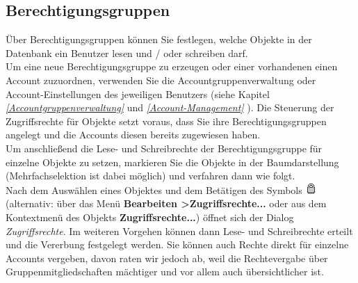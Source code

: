 \documentclass[a4paper,10pt]{book}
\begin{document}
\subsection{Berechtigungsgruppen} \label{Berechtigungsgruppen}
Über Berechtigungsgruppen können Sie festlegen, welche Objekte in der Datenbank ein Benutzer lesen und / oder schreiben darf.
\newline\\
Um eine neue Berechtigungsgruppe zu erzeugen oder einer vorhandenen einen Account zuzuordnen, verwenden Sie die Accountgruppenverwaltung oder Account-Einstellungen des jeweiligen Benutzers (siehe Kapitel {\em \ref{Accountgruppenverwaltung} } und {\em \ref{Account-Management} }). Die Steuerung der Zugriffsrechte für Objekte setzt voraus, dass Sie
ihre Berechtigungsgruppen angelegt und die Accounts diesen bereits zugewiesen haben.
\newline\\
Um anschließend die Lese- und Schreibrechte der Berechtigungsgruppe für einzelne Objekte zu setzen, markieren Sie die Objekte in der
Baumdarstellung (Mehrfachselektion ist dabei möglich) und verfahren dann wie folgt.
\newline\\
Nach dem Auswählen eines Objektes und dem Betätigen des Symbols \includegraphics[height=2ex]{Icon/Zugriffsrechte.png} (alternativ:
über das Menü \textbf{Bearbeiten \textgreater Zugriffsrechte...} oder aus dem Kontextmenü des Objekts \textbf{Zugriffsrechte...})
öffnet sich der Dialog \textit{Zugriffsrechte}. Im weiteren Vorgehen können dann Lese- und Schreibrechte erteilt und die Vererbung festgelegt werden. Sie können auch Rechte direkt für einzelne Accounts vergeben, davon raten wir jedoch ab, weil die Rechtevergabe über
Gruppenmitgliedschaften mächtiger und vor allem auch übersichtlicher ist.
\newline
\end{document}
